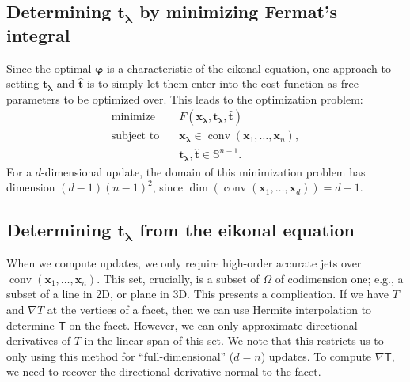 \documentclass{siamart190516}
\renewcommand{\phi}{\varphi}
\newcommand{\m}[1]{\boldsymbol{#1}}
\newcommand{\xlam}{\m{x}_{\m{\lambda}}}
\newcommand{\that}{\hat{\m{t}}}
\newcommand{\tlam}{\m{t}_{\m{\lambda}}}
\newcommand{\mphi}{\m{\phi}}
\DeclareMathOperator{\conv}{conv}
\begin{document}
\subsection{Determining $\tlam$ by minimizing Fermat's
  integral}\label{ssec:full-minimization}

Since the optimal $\mphi$ is a characteristic of the eikonal equation,
one approach to setting $\tlam$ and $\that$ is to simply let them
enter into the cost function as free parameters to be optimized
over. This leads to the optimization problem:
\begin{equation}\label{eq:minimization-problem-1}
  \begin{split}
    \mbox{minimize} &\quad F(\xlam, \tlam, \that) \\
    \mbox{subject to} &\quad \xlam \in \conv(\m{x}_1, \hdots, \m{x}_n), \\
    &\quad \tlam, \that \in \mathbb{S}^{n-1}.
  \end{split}
\end{equation}
For a $d$-dimensional update, the domain of this minimization problem
has dimension $(d - 1)(n - 1)^2$, since
$\dim(\conv(\m{x}_1, \hdots, \m{x}_d)) = d - 1$.

\subsection{Determining $\tlam$ from the eikonal
  equation}\label{ssec:eikonal-method}

When we compute updates, we only require high-order accurate jets over
$\conv(\m{x}_1, \hdots, \m{x}_n)$. This set, crucially, is a subset of
$\Omega$ of codimension one; e.g., a subset of a line in 2D, or plane
in 3D. This presents a complication. If we have $T$ and $\nabla T$ at
the vertices of a facet, then we can use Hermite interpolation to
determine $\mathsf{T}$ on the facet. However, we can only approximate
directional derivatives of $T$ in the linear span of this set. We note
that this restricts us to only using this method for
``full-dimensional'' ($d = n$) updates. To compute $\nabla\mathsf{T}$,
we need to recover the directional derivative normal to the facet.
\end{document}
